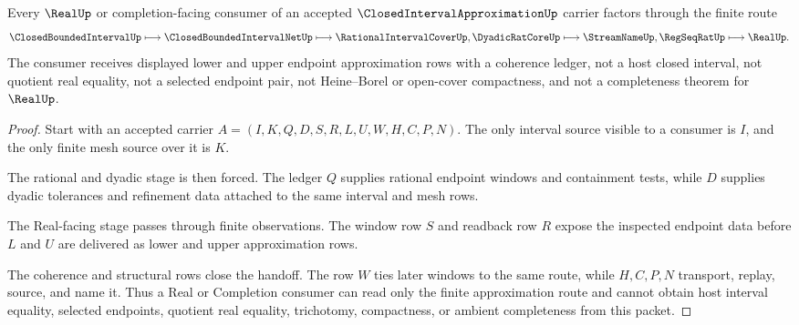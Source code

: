 \begin{theorem}
\label{thm:closed-interval-approximation-real-window-handoff}
Every $\RealUp$ or completion-facing consumer of an accepted $\ClosedIntervalApproximationUp$ carrier factors through the finite route
$$
\ClosedBoundedIntervalUp
\longmapsto \ClosedBoundedIntervalNetUp
\longmapsto \RationalIntervalCoverUp,\DyadicRatCoreUp
\longmapsto \StreamNameUp,\RegSeqRatUp
\longmapsto \RealUp .
$$
The consumer receives displayed lower and upper endpoint approximation rows with a coherence ledger, not a host closed interval, not quotient real equality, not a selected endpoint pair, not Heine--Borel or open-cover compactness, and not a completeness theorem for $\RealUp$.
\end{theorem}
\begin{proof}
Start with an accepted carrier $A=(I,K,Q,D,S,R,L,U,W,H,C,P,N)$. The only interval source visible to a consumer is $I$, and the only finite mesh source over it is $K$.

The rational and dyadic stage is then forced. The ledger $Q$ supplies rational endpoint windows and containment tests, while $D$ supplies dyadic tolerances and refinement data attached to the same interval and mesh rows.

The Real-facing stage passes through finite observations. The window row $S$ and readback row $R$ expose the inspected endpoint data before $L$ and $U$ are delivered as lower and upper approximation rows.

The coherence and structural rows close the handoff. The row $W$ ties later windows to the same route, while $H,C,P,N$ transport, replay, source, and name it. Thus a Real or Completion consumer can read only the finite approximation route and cannot obtain host interval equality, selected endpoints, quotient real equality, trichotomy, compactness, or ambient completeness from this packet.
\end{proof}



